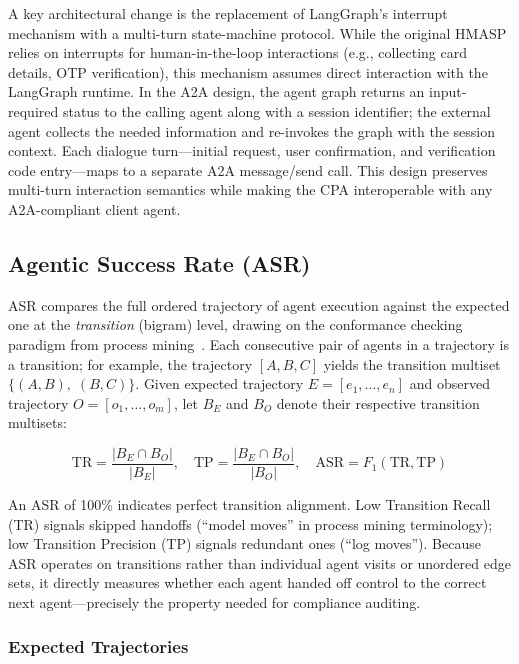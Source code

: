 A key architectural change is the replacement of LangGraph's interrupt mechanism with a multi-turn state-machine protocol. While the original HMASP relies on interrupts for human-in-the-loop interactions (e.g., collecting card details, OTP verification), this mechanism assumes direct interaction with the LangGraph runtime. In the A2A design, the agent graph returns an input-required status to the calling agent along with a session identifier; the external agent collects the needed information and re-invokes the graph with the session context. Each dialogue turn---initial request, user confirmation, and verification code entry---maps to a separate A2A message/send call. This design preserves multi-turn interaction semantics while making the CPA interoperable with any A2A-compliant client agent.

\subsection{Agentic Success Rate (ASR)}
\label{sec:asr_definition}

ASR compares the full ordered trajectory of agent execution against the expected one at the \emph{transition} (bigram) level, drawing on the conformance checking paradigm from process mining~\cite{vanderaalst2012conformance,carmona2018conformance}. Each consecutive pair of agents in a trajectory is a transition; for example, the trajectory $[A, B, C]$ yields the transition multiset $\{(A{,}B),\;(B{,}C)\}$. Given expected trajectory $E = [e_1, \ldots, e_n]$ and observed trajectory $O = [o_1, \ldots, o_m]$, let $B_E$ and $B_O$ denote their respective transition multisets:

\begin{equation}
\text{TR} = \frac{|B_E \cap B_O|}{|B_E|}, \quad
\text{TP} = \frac{|B_E \cap B_O|}{|B_O|}, \quad
\text{ASR} = F_1(\text{TR}, \text{TP})
\end{equation}

An ASR of 100\% indicates perfect transition alignment. Low Transition Recall (TR) signals skipped handoffs (``model moves'' in process mining terminology); low Transition Precision (TP) signals redundant ones (``log moves''). Because ASR operates on transitions rather than individual agent visits or unordered edge sets, it directly measures whether each agent handed off control to the correct next agent---precisely the property needed for compliance auditing.

\subsubsection{Expected Trajectories}

